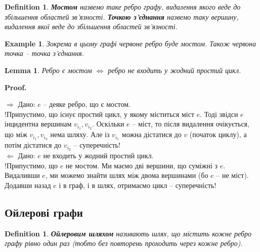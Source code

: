 \documentclass[a4paper, 14pt]{extarticle}
\makeatletter
\def\rightproof{$\boxed{\Rightarrow}$ }
\def\leftproof{$\boxed{\Leftarrow}$ }
\theoremstyle{theoremdd}
\theoremstyle{theoremdd}
\newtheorem{definition}[theorem]{Definition}
\theoremstyle{theoremdd}
\theoremstyle{theoremdd}
\theoremstyle{theoremdd}
\newtheorem{example}[theorem]{Example}
\theoremstyle{theoremdd}
\theoremstyle{theoremdd}
\theoremstyle{theoremdd}
\theoremstyle{theoremdd}
\theoremstyle{theoremdd}
\theoremstyle{theoremdd}
\theoremstyle{theoremdd}
\theoremstyle{theoremdd}
\newtheorem{lemma}[theorem]{Lemma}
\theoremstyle{theoremdd}
\theoremstyle{theoremdd}
\renewenvironment{proof}[1][Proof.\\]{\par
\pushQED{\hfill \qed}%
\normalfont \topsep6\p@\@plus6\p@\relax
\trivlist
\item\relax
{\bfseries
#1\@addpunct{.}}\hspace\labelsep\ignorespaces
}{%
\popQED\endtrivlist\@endpefalse
}
\makeatother
\begin{document}
\begin{definition}
\textbf{Мостом} назвемо таке ребро графу, видалення якого веде до збільшення областей зв'язності. \textbf{Точкою з'єднання} назвемо таку вершину, видалення якої веде до збільшення областей зв'язності.
\end{definition}

\begin{example}
Зокрема в цьому графі червоне ребро буде мостом. Також червона точка -- точка з'єднання.
\begin{figure}[H]
\centering
{}
\end{figure}
\end{example}

\begin{lemma}
Ребро є мостом $\iff$ ребро не входить у жодний простий цикл.
\end{lemma}

\begin{proof}
\rightproof Дано: $e$ -- деяке ребро, що є мостом.\\
!Припустимо, що існує простий цикл, у якому міститься міст $e$. Тоді звідси $e$ інцидентна вершинам $v_{i_1},v_{i_2}$. Оскільки $e$ -- міст, то після видалення очікується, що між $v_{i_1},v_{i_2}$ нема шляху. Але із $v_{i_1}$ можна дістатися до $v$ (початок циклу), а потім дістатися до $v_{i_2}$ -- суперечність!
\bigskip \\
\leftproof Дано: $e$ не входить у жодний простий цикл.\\
!Припустимо, що $e$ не мостом. Ми маємо дві вершини, що суміжні з $e$. Видаливши $e$, ми можемо знайти шлях між двома вершинами (бо $e$ -- не міст). Додавши назад $e$ і в граф, і в шлях, отримаємо цикл -- суперечність!
\end{proof}

\subsection{Ойлерові графи}
\begin{definition}
\textbf{Ойлеровим шляхом} називають шлях, що містить кожне ребро графу рівно один раз (тобто без повторень проходить через кожне ребро).
\end{definition}
\end{document}
